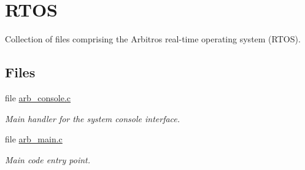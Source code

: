 \hypertarget{group___r_t_o_s}{\section{R\-T\-O\-S}
\label{group___r_t_o_s}
}


Collection of files comprising the Arbitros real-\/time operating system (R\-T\-O\-S).  


\subsection*{Files}
\begin{DoxyCompactItemize}
\item 
file \hyperlink{arb__console_8c}{arb\-\_\-console.\-c}
\begin{DoxyCompactList}\small\item\em Main handler for the system console interface. \end{DoxyCompactList}\item 
file \hyperlink{arb__main_8c}{arb\-\_\-main.\-c}
\begin{DoxyCompactList}\small\item\em Main code entry point. \end{DoxyCompactList}\end{DoxyCompactItemize}


